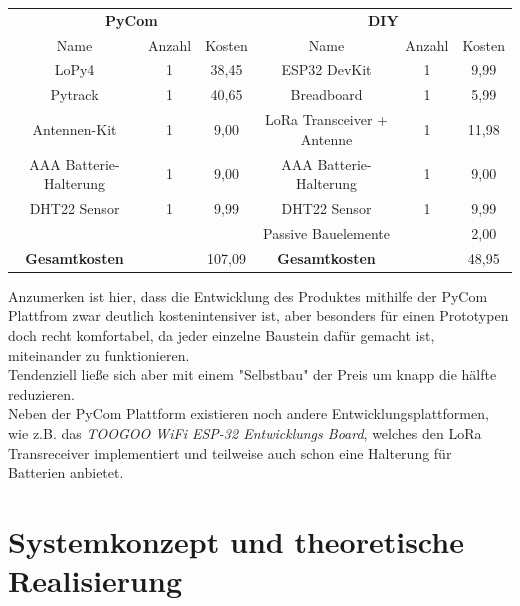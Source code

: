 \begin{adjustwidth}{-1in}{-1in}%
	\begin{center}

	        \begin{tabular}{cccccc}
			\toprule
			\multicolumn{3}{c}{\textbf{PyCom}} & \multicolumn{3}{c}{\textbf{DIY}}\\

			Name & Anzahl & Kosten & Name & Anzahl & Kosten\\

			\midrule
			LoPy4 & 1 & 38,45 & ESP32 DevKit & 1 & 9,99\\
			Pytrack  & 1 & 40,65 & Breadboard & 1 & 5,99\\
			Antennen-Kit  & 1 & 9,00 & LoRa Transceiver + Antenne & 1 & 11,98\\
			AAA Batterie-Halterung & 1 & 9,00 & AAA Batterie-Halterung & 1 & 9,00 \\
			DHT22 Sensor & 1 & 9,99 & DHT22 Sensor & 1 & 9,99\\
			 &  &  & Passive Bauelemente &  & 2,00\\

			\midrule
			\textbf{Gesamtkosten} & & 107,09 & \textbf{Gesamtkosten} & & 48,95\\

			\bottomrule

	        \end{tabular}
		\label{}
		 \label{tab:kostenaustellung} 
	\end{center}
\end{adjustwidth}

Anzumerken ist hier, dass die Entwicklung des Produktes mithilfe der PyCom Plattfrom zwar deutlich kostenintensiver ist, aber besonders für einen Prototypen doch recht komfortabel, da jeder einzelne Baustein dafür gemacht ist, miteinander zu funktionieren.\\
Tendenziell ließe sich aber mit einem "Selbstbau" der Preis um knapp die hälfte reduzieren.\\
Neben der PyCom Plattform existieren noch andere Entwicklungsplattformen, wie z.B. das \textit{TOOGOO WiFi ESP-32 Entwicklungs Board}, welches den LoRa Transreceiver implementiert und teilweise auch schon eine Halterung für Batterien anbietet. 


\section{Systemkonzept und theoretische Realisierung} \label{Systemkonzept und theoretische Realisierung}


